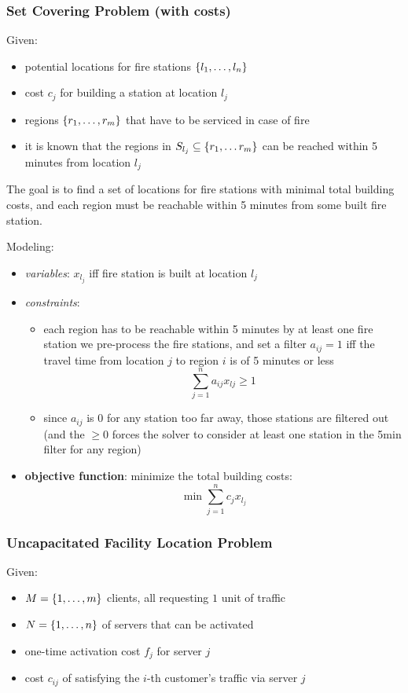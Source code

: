 \documentclass[a4paper, 11pt]{report}
\begin{document}
\subsubsection{Set Covering Problem (with costs)}
Given:
\begin{itemize}
    \item potential locations for fire stations $\set{l_1, \dots, l_{n}}$
    \item cost $c_{j}$ for building a station at location $l_{j}$
    \item regions $\set{r_1, \dots , r_{m}}$ that have to be serviced in case of fire
    \item it is known that the regions in $S_{l_{j}} \subseteq \set{r_1, \dots r_{m}}$ can be reached within 5 minutes from location $l_{j}$
\end{itemize}

The goal is to find a set of locations for fire stations with minimal total building costs, and each region must be reachable within 5 minutes from some built fire station.

Modeling:
\begin{itemize}
    \item \textit{variables}: $x_{l_{j}}$ iff fire station is built at location $l_{j}$
    \item \textit{constraints}:
        \begin{itemize}
            \item each region has to be reachable within 5 minutes by at least one fire station
                \subitem we pre-process the fire stations, and set a filter $a_{ij} =1$ iff the travel time from location $j$ to region $i$ is of 5 minutes or less
                $$ \sum_{j=1}^{n} a_{ij}x_{lj} \geq 1 $$
            \item since $a_{ij}$ is $0$ for any station too far away, those stations are filtered out (and the $\geq 0$ forces the solver to consider at least one station in the 5min filter for any region)
        \end{itemize}
    \item \textbf{objective function}: minimize the total building costs:
        $$ \min \sum_{j=1}^{n} c_{j}x_{l_{j}} $$
\end{itemize}

\subsubsection{Uncapacitated Facility Location Problem}
Given:
\begin{itemize}
    \item $M = \set{1, \dots, m}$ clients, all requesting $1$ unit of traffic
    \item $N = \set{1, \dots , n}$ of servers that can be activated
    \item one-time activation cost $f_{j}$ for server $j$
    \item cost $c_{ij}$ of satisfying the $i$-th customer's traffic via server $j$
\end{itemize}
\end{document}

